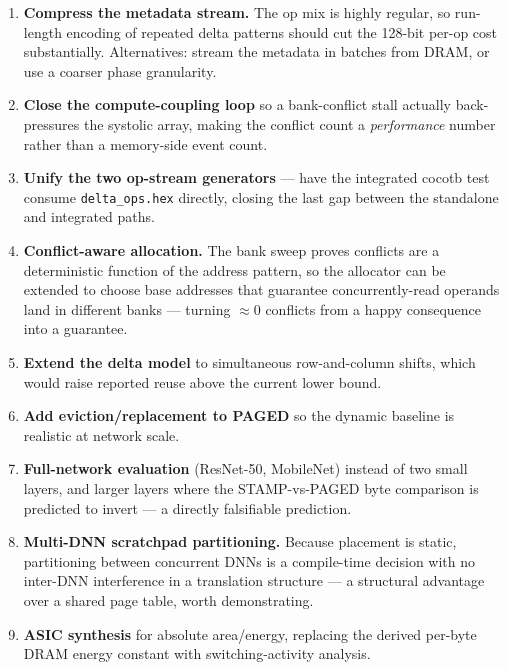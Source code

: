 \documentclass[11pt,a4paper]{article}
\newcommand{\file}[1]{\texttt{\small #1}}
\begin{document}
\begin{enumerate}[leftmargin=1.6em,itemsep=4pt]
  \item \textbf{Compress the metadata stream.} The op mix is highly regular, so
        run-length encoding of repeated delta patterns should cut the 128-bit
        per-op cost substantially. Alternatives: stream the metadata in batches
        from DRAM, or use a coarser phase granularity.
  \item \textbf{Close the compute-coupling loop} so a bank-conflict stall
        actually back-pressures the systolic array, making the conflict count a
        \emph{performance} number rather than a memory-side event count.
  \item \textbf{Unify the two op-stream generators} --- have the integrated
        cocotb test consume \file{delta\_ops.hex} directly, closing the last gap
        between the standalone and integrated paths.
  \item \textbf{Conflict-aware allocation.} The bank sweep proves conflicts are
        a deterministic function of the address pattern, so the allocator can be
        extended to choose base addresses that guarantee concurrently-read
        operands land in different banks --- turning $\approx$0 conflicts from
        a happy consequence into a guarantee.
  \item \textbf{Extend the delta model} to simultaneous row-and-column shifts,
        which would raise reported reuse above the current lower bound.
  \item \textbf{Add eviction/replacement to PAGED} so the dynamic baseline is
        realistic at network scale.
  \item \textbf{Full-network evaluation} (ResNet-50, MobileNet) instead of two
        small layers, and larger layers where the STAMP-vs-PAGED byte comparison
        is predicted to invert --- a directly falsifiable prediction.
  \item \textbf{Multi-DNN scratchpad partitioning.} Because placement is static,
        partitioning between concurrent DNNs is a compile-time decision with no
        inter-DNN interference in a translation structure --- a structural
        advantage over a shared page table, worth demonstrating.
  \item \textbf{ASIC synthesis} for absolute area/energy, replacing the derived
        per-byte DRAM energy constant with switching-activity analysis.
\end{enumerate}

\end{document}
